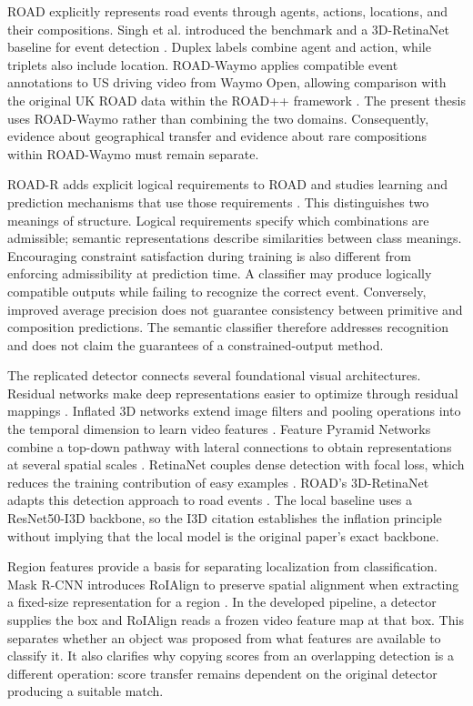 ROAD explicitly represents road events through agents, actions, locations, and their compositions. Singh et al. introduced the benchmark and a 3D-RetinaNet baseline for event detection \cite{road}. Duplex labels combine agent and action, while triplets also include location. ROAD-Waymo applies compatible event annotations to US driving video from Waymo Open, allowing comparison with the original UK ROAD data within the ROAD++ framework \cite{road-waymo}. The present thesis uses ROAD-Waymo rather than combining the two domains. Consequently, evidence about geographical transfer and evidence about rare compositions within ROAD-Waymo must remain separate.

ROAD-R adds explicit logical requirements to ROAD and studies learning and prediction mechanisms that use those requirements \cite{road-r}. This distinguishes two meanings of structure. Logical requirements specify which combinations are admissible; semantic representations describe similarities between class meanings. Encouraging constraint satisfaction during training is also different from enforcing admissibility at prediction time. A classifier may produce logically compatible outputs while failing to recognize the correct event. Conversely, improved average precision does not guarantee consistency between primitive and composition predictions. The semantic classifier therefore addresses recognition and does not claim the guarantees of a constrained-output method.

The replicated detector connects several foundational visual architectures. Residual networks make deep representations easier to optimize through residual mappings \cite{resnet}. Inflated 3D networks extend image filters and pooling operations into the temporal dimension to learn video features \cite{i3d}. Feature Pyramid Networks combine a top-down pathway with lateral connections to obtain representations at several spatial scales \cite{fpn}. RetinaNet couples dense detection with focal loss, which reduces the training contribution of easy examples \cite{focal-loss}. ROAD's 3D-RetinaNet adapts this detection approach to road events \cite{road}. The local baseline uses a ResNet50-I3D backbone, so the I3D citation establishes the inflation principle without implying that the local model is the original paper's exact backbone.

Region features provide a basis for separating localization from classification. Mask R-CNN introduces RoIAlign to preserve spatial alignment when extracting a fixed-size representation for a region \cite{mask-rcnn}. In the developed pipeline, a detector supplies the box and RoIAlign reads a frozen video feature map at that box. This separates whether an object was proposed from what features are available to classify it. It also clarifies why copying scores from an overlapping detection is a different operation: score transfer remains dependent on the original detector producing a suitable match.

